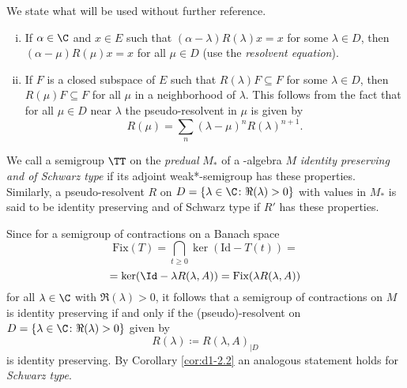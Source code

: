 We state what will be used without further reference.
\begin{enumerate}[(i)]
\item 
If $ \alpha \in \C $ and $ x \in E $ such that $ (\alpha - \lambda)R(\lambda)x = x $ for some $ \lambda \in D $, then $ (\alpha - \mu)R(\mu)x = x $ for all $ \mu \in D $ (use the \emph{resolvent equation}).

\item 
If $ F $ is a closed subspace of $ E $ such that $ R(\lambda)F \subseteq F $ for some $ \lambda \in D $, then $ R(\mu)F \subseteq F $ for all $ \mu $ in a neighborhood of $ \lambda $.
This follows from the fact that for all $ \mu \in D $ near $ \lambda $ the pseudo-resolvent in $ \mu $ is given by
\[
R(\mu) = \sum_{n} (\lambda - \mu)^{n} R(\lambda)^{n+1}.
\]
\end{enumerate}
\begin{definition}\label{def:d1-2.5}
We call a semigroup $ \TT $ on the \emph{predual} $ M_{*} $ of a \WA-algebra $ M $ \emph{identity preserving and of Schwarz type} if its adjoint weak*-semigroup has these properties.
Similarly, a pseudo-resolvent $ R $ on $ D = \{\lambda \in \C \colon \Re(\lambda) > 0\} $ with values in $ M_{*} $ is said to be identity preserving and of Schwarz type if $ R' $ has these properties.
\end{definition}
Since for a semigroup of contractions on a Banach space
\[
\text{Fix}(T) = \bigcap_{t \geq 0} \ker(\text{Id} - T(t)) =
\]
\[
= \ker(\Id - \lambda R(\lambda,A)) = \text{Fix}(\lambda R(\lambda,A))
\]
for all $ \lambda \in \C $ with $ \Re(\lambda) > 0 $, it follows that a semigroup of contractions on $ M $ is identity preserving if and only if the (pseudo)-resolvent on $ D = \{\lambda \in \C \colon \Re(\lambda) > 0\} $ given by
\[
R(\lambda) \coloneqq R(\lambda,A)_{\vert D}
\]
is identity preserving.
By Corollary \ref{cor:d1-2.2} an analogous statement holds for \emph{Schwarz type}.
%
%
